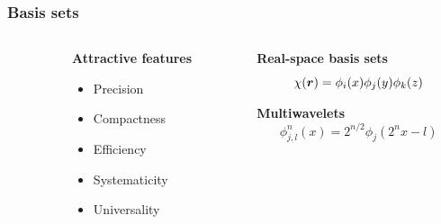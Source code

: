 \begin{frame}
    \frametitle{Basis sets}
    \begin{columns}
    \begin{column}{.10\textwidth}
    \end{column}
    \begin{column}{.30\textwidth}
    \textbf{Attractive features}
    \begin{itemize}
        \item {\color{green} Precision}
        \item {\color{red} Compactness}
        \item {\color{green} Efficiency}
        \item {\color{green} Systematicity}
        \item {\color{green} Universality}
    \end{itemize}
    \end{column}
    \begin{column}{.60\textwidth}
    \centering
    \textbf{Real-space basis sets}
    \begin{equation}
        \nonumber
        \chi(\boldsymbol r) = \phi_i(x)\phi_j(y)\phi_k(z)
    \end{equation}

    \vspace{4.2mm}

    \textbf{Multiwavelets}
    \begin{equation}
        \nonumber
        \phi_{j,l}^n(x) = 2^{n/2}\phi_j(2^nx-l)
    \end{equation}
    \end{column}
    \end{columns}

    \vspace{5mm}


\end{frame}
